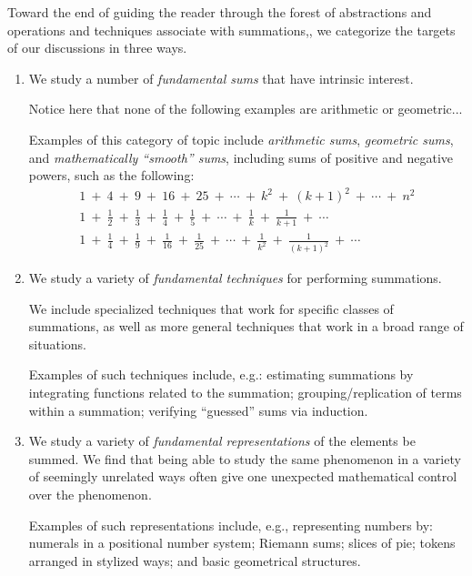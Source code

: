 Toward the end of guiding the reader through the forest of
abstractions and operations and techniques associate with summations,,
we categorize the targets of our discussions in three ways.
\begin{enumerate}
\item
We study a number of {\it fundamental sums} that have intrinsic
interest.

{\Denis Notice here that none of the following examples are arithmetic or geometric...}

Examples of this category of topic include {\it arithmetic sums}, {\it
  geometric sums}, and {\it mathematically ``smooth'' sums}, including
sums of positive and negative powers, such as the following:
\[
\begin{array}{l}
1 \ + \ 4 \ + \ 9 \ + \ 16 \ + \ 25 \ + \ \cdots \ + \ k^2  \ + \ (k+1)^2 \ +
\ \cdots \ + \ n^2 \\
1 \ + \ \frac{1}{2} \ + \ \frac{1}{3} \ + \ \frac{1}{4} \ +
\ \frac{1}{5} \ + \ \cdots \ + \ \frac{1}{k}  \ + \ \frac{1}{k+1} \ +
\ \cdots \\
1 \ + \ \frac{1}{4} \ + \ \frac{1}{9} \ + \ \frac{1}{16} \ +
\ \frac{1}{25} \ + \ \cdots \ + \ \frac{1}{k^2}  \ + \ \frac{1}{(k+1)^2} \ +
\ \cdots
\end{array}
\]

\item
We study a variety of {\it fundamental techniques} for performing
summations.

We include specialized techniques that work for specific classes of
summations, as well as more general techniques that work in a broad
range of situations.

Examples of such techniques include, e.g.: estimating summations by
integrating functions related to the summation; grouping/replication
of terms within a summation; verifying ``guessed'' sums via induction.

\item
We study a variety of {\it fundamental representations} of the
elements be summed.  We find that being able to study the same
phenomenon in a variety of seemingly unrelated ways often give one
unexpected mathematical control over the phenomenon.

Examples of such representations include, e.g., representing numbers
by: numerals in a positional number system; Riemann sums; slices of
pie; tokens arranged in stylized ways; and basic geometrical
structures.
\end{enumerate}

